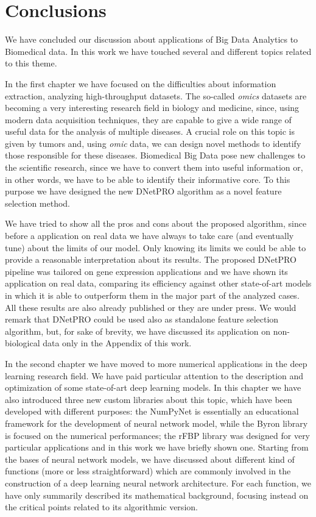 \documentclass{standalone}
\begin{document}
\chapter*{Conclusions}\label{conclusions}

We have concluded our discussion about applications of Big Data Analytics to Biomedical data.
In this work we have touched several and different topics related to this theme.

In the first chapter we have focused on the difficulties about information extraction, analyzing high-throughput datasets.
The so-called \emph{omics} datasets are becoming a very interesting research field in biology and medicine, since, using modern data acquisition techniques, they are capable to give a wide range of useful data for the analysis of multiple diseases.
A crucial role on this topic is given by tumors and, using \emph{omic} data, we can design novel methods to identify those responsible for these diseases.
Biomedical Big Data pose new challenges to the scientific research, since we have to convert them into useful information or, in other words, we have to be able to identify their informative core.
To this purpose we have designed the new \textsf{DNetPRO} algorithm as a novel feature selection method.

We have tried to show all the pros and cons about the proposed algorithm, since before a application on real data we have always to take care (and eventually tune) about the limits of our model.
Only knowing its limits we could be able to provide a reasonable interpretation about its results.
The proposed \textsf{DNetPRO} pipeline was tailored on gene expression applications and we have shown its application on real data, comparing its efficiency against other state-of-art models in which it is able to outperform them in the major part of the analyzed cases.
All these results are also already published or they are under press.
We would remark that \textsf{DNetPRO} could be used also as standalone feature selection algorithm, but, for sake of brevity, we have discussed its application on non-biological data only in the Appendix of this work.

In the second chapter we have moved to more numerical applications in the deep learning research field.
We have paid particular attention to the description and optimization of some state-of-art deep learning models.
In this chapter we have also introduced three new custom libraries about this topic, which have been developed with different purposes: the \textsf{NumPyNet} is essentially an educational framework for the development of neural network model, while the \textsf{Byron} library is focused on the numerical performances; the \textsf{rFBP} library was designed for very particular applications and in this work we have briefly shown one.
Starting from the bases of neural network models, we have discussed about different kind of functions (more or less straightforward) which are commonly involved in the construction of a deep learning neural network architecture.
For each function, we have only summarily described its mathematical background, focusing instead on the critical points related to its algorithmic version.
\end{document}
